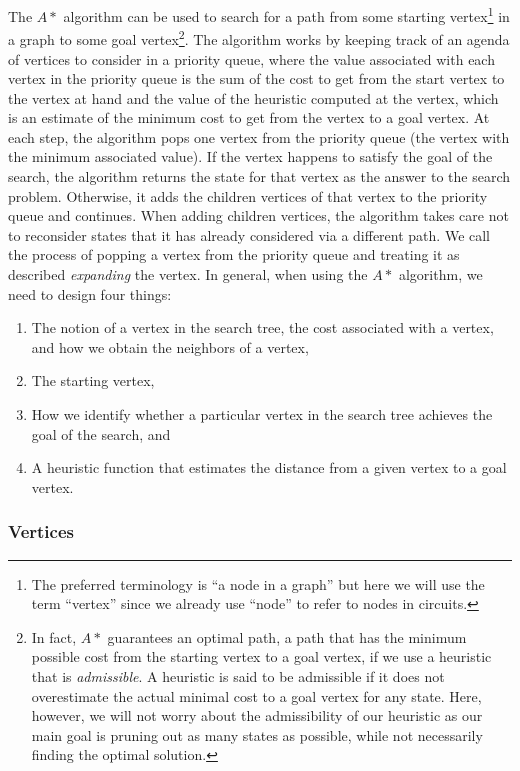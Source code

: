 The $A*$ algorithm can be used to search for a path from some starting
vertex\footnote{The preferred terminology is ``a node in a graph'' but here we
will use the term ``vertex'' since we already use ``node'' to refer to nodes in
circuits.} in
a graph to some goal vertex\footnote{In fact, $A*$ guarantees an optimal path, a
path that has the minimum possible cost from the starting vertex to a goal
vertex, if we use a heuristic that is \emph{admissible}. A heuristic is said to
be admissible if it does not overestimate the actual minimal cost to a goal
vertex
for any state. Here, however, we will not worry about the admissibility of our
heuristic as our main goal is pruning out as many states as possible, while not
necessarily finding the optimal solution.}.
The algorithm works by keeping track of an agenda
of vertices to consider
in a priority queue, where the value associated with each vertex in the priority
queue is the sum of the cost to get from the start vertex to the vertex at hand
and the value of the heuristic
computed at the vertex, which is an estimate of the minimum
cost to get from the vertex to a goal vertex.
At each step, the algorithm pops
one vertex from the priority queue (the vertex with the minimum associated
value). If the vertex happens to satisfy the goal of
the search, the algorithm returns the state for that vertex as the answer to
the search
problem. Otherwise, it adds the children vertices of that vertex to the priority
queue and continues. When adding children vertices, the algorithm takes care not
to reconsider
states that it has already considered via a different path. We call the process
of popping a vertex from the priority queue and treating it as described
\emph{expanding} the vertex.
In general, when using the $A*$ algorithm, we need to design four things:

\begin{enumerate}
\item The notion of a vertex in the
search tree, the cost associated with a vertex, and how we obtain the neighbors
of a vertex,
\item The starting vertex,
\item How we identify whether a particular vertex in the search tree achieves
the goal of the search, and
\item A heuristic function that estimates the distance from a given vertex to a
goal vertex.
\end{enumerate}

\subsubsection{Vertices}
\label{sec:vertices}

